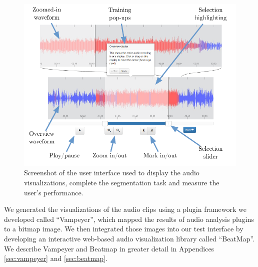 \begin{figure}[p]
\centering
\includegraphics[width=\columnwidth]{figs/browser-audio-interface}
\caption{Screenshot of the user interface used to display the audio visualizations, complete the segmentation task and
measure the user's performance.}
\label{fig:visualization-interface}
\end{figure}



We generated the visualizations of the audio clips using a plugin framework we developed called ``Vampeyer'', which
mapped the results of audio analysis plugins to a bitmap image. We then integrated those images into our test interface
by developing an interactive web-based audio visualization library called ``BeatMap''.  We describe Vampeyer and
Beatmap in greater detail in Appendices \ref{sec:vampeyer} and \ref{sec:beatmap}.

